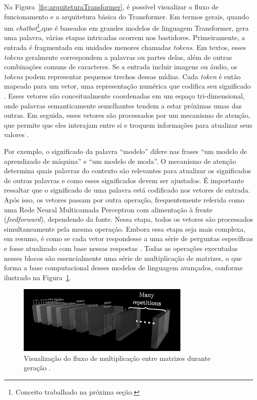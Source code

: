 \documentclass[10pt, conference, compsocconf]{IEEEtran}
\begin{document}
Na Figura~\ref{fig:arquiteturaTransformer}, é possível visualizar o fluxo de funcionamento e a arquitetura básica do Transformer. Em termos gerais, quando um \textit{chatbot}\footnote{Conceito trabalhado na próxima seção.},que é baseados em grandes modelos de linguagem Transformer, gera uma palavra, várias etapas intricadas ocorrem nos bastidores. Primeiramente, a entrada é fragmentada em unidades menores chamadas \textit{tokens}. Em textos, esses \textit{tokens} geralmente correspondem a palavras ou partes delas, além de outras combinações comuns de caracteres. Se a entrada incluir imagens ou áudio, os \textit{tokens} podem representar pequenos trechos dessas mídias. Cada \textit{token} é então mapeado para um vetor, uma representação numérica que codifica seu significado \cite{Introduction-to-Information-Retrieval}. Esses vetores são conceitualmente coordenadas em um espaço tri-dimensional, onde palavras semanticamente semelhantes tendem a estar próximas umas das outras. Em seguida, esses vetores são processados por um mecanismo de atenção, que permite que eles interajam entre si e troquem informações para atualizar seus valores \cite{Attention-Is-All-You-Need}.

Por exemplo, o significado da palavra ``modelo'' difere nas frases ``um modelo de aprendizado de máquina'' e ``um modelo de moda''. O mecanismo de atenção determina quais palavras do contexto são relevantes para atualizar os significados de outras palavras e como esses significados devem ser ajustados. É importante ressaltar que o significado de uma palavra está codificado nos vetores de entrada. Após isso, os vetores passam por outra operação, frequentemente referida como uma Rede Neural Multicamada Perceptron com alimentação à frente (\textit{feedforward}), dependendo da fonte. Nessa etapa, todos os vetores são processados simultaneamente pela mesma operação. Embora essa etapa seja mais complexa, em resumo, é como se cada vetor respondesse a uma série de perguntas específicas e fosse atualizado com base nessas respostas \cite{Attention-Is-All-You-Need}. Todas as operações executadas nesses blocos são essencialmente uma série de multiplicação de matrizes, o que forma a base computacional desses modelos de linguagem avançados, conforme ilustrado na Figura~\ref{fig:VisualizacaoMatrizes.}.

\FloatBarrier

\begin{figure}[!h]
\centering
\includegraphics[width=3.3in]{images/Transformer inference in tokens flow.png}
\caption{Visualização do fluxo de multiplicação entre matrizes durante geração \cite{3Blue1Brown}.} 
\label{fig:VisualizacaoMatrizes.}
\end{figure}
\end{document}
